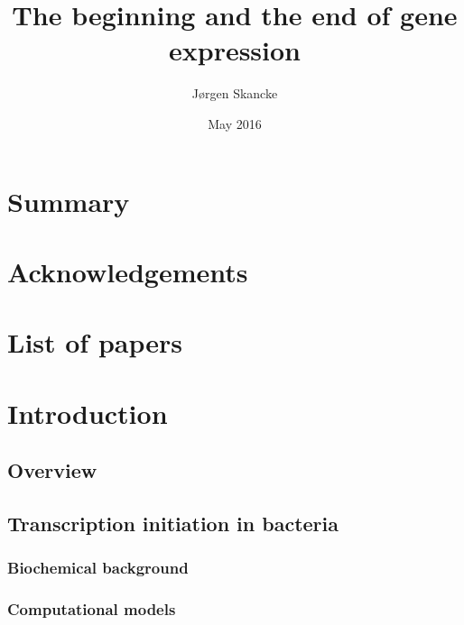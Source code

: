\documentclass[]{ntnuthesis}
\title{The beginning and the end of gene expression}
\author{Jørgen Skancke}
\date{May 2016}
\begin{document}
 

\frontmatter

\maketitle

\chapter*{Summary}
\noindent
    
\clearpage


\chapter*{Acknowledgements}

\chapter*{List of papers}


\tableofcontents
\listoffigures
\listoftables

\setcounter{chapter}{1}
\mainmatter
\chapter{Introduction}
\begin{refsection}
\section{Overview}

\FloatBarrier


\section{Transcription initiation in bacteria}

\subsection{Biochemical background}

\subsection{Computational models}

\printbibliography
\end{refsection}
\newpage
\end{document}
